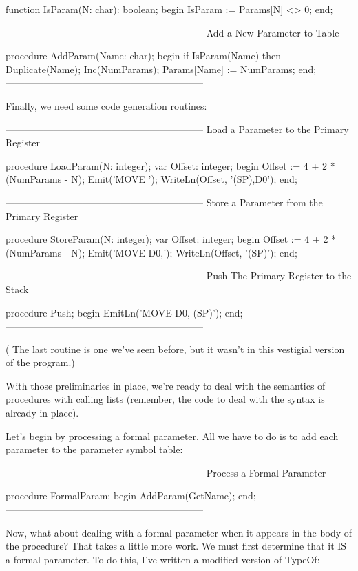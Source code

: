 \documentclass[float=false, crop=false]{standalone}
\begin{document}
function IsParam(N: char): boolean;
begin
     IsParam := Params[N] <> 0;
end;


{--------------------------------------------------------------}
{ Add a New Parameter to Table }

procedure AddParam(Name: char);
begin
     if IsParam(Name) then Duplicate(Name);
     Inc(NumParams);
     Params[Name] := NumParams;
end;
{--------------------------------------------------------------}


Finally, we need some code generation routines:


{--------------------------------------------------------------}
{ Load a Parameter to the Primary Register }

procedure LoadParam(N: integer);
var Offset: integer;
begin
     Offset := 4 + 2 * (NumParams - N);
     Emit('MOVE ');
     WriteLn(Offset, '(SP),D0');
end;


{--------------------------------------------------------------}
{ Store a Parameter from the Primary Register }

procedure StoreParam(N: integer);
var Offset: integer;
begin
     Offset := 4 + 2 * (NumParams - N);
     Emit('MOVE D0,');
     WriteLn(Offset, '(SP)');
end;


{--------------------------------------------------------------}
{ Push The Primary Register to the Stack }

procedure Push;
begin
     EmitLn('MOVE D0,-(SP)');
end;
{--------------------------------------------------------------}


( The last routine is one we've seen before, but it wasn't in this vestigial
version of the program.)

With those preliminaries in place, we're ready to deal with the semantics of
procedures with calling lists (remember, the code to deal with the syntax is
already in place).

Let's begin by processing a formal parameter. All we have to do is to add each
parameter to the parameter symbol table:


{--------------------------------------------------------------}
{ Process a Formal Parameter }

procedure FormalParam;
begin
     AddParam(GetName);
end;
{--------------------------------------------------------------}


Now, what about dealing with a formal parameter when it appears in the body of
the procedure? That takes a little more work. We must first determine that it IS
a formal parameter. To do this, I've written a modified version of TypeOf:
\end{document}
